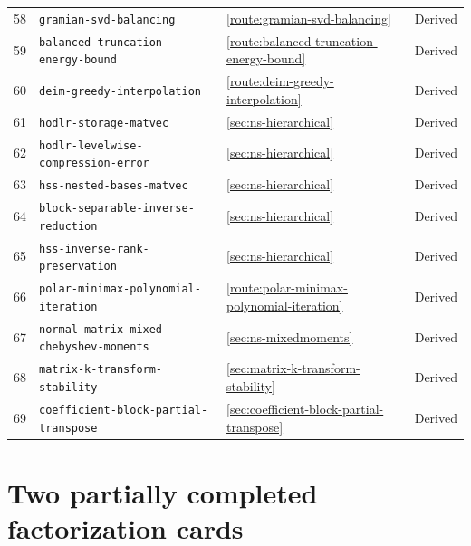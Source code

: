 \documentclass[11pt,a4paper]{article}
\DeclareRobustCommand{\code}[1]{{\footnotesize\urlstyle{tt}\nolinkurl{#1}}}
\begin{document}
\begin{longtable}{@{}r p{} l l@{}}
58 & \code{gramian-svd-balancing} & \ref{route:gramian-svd-balancing} & Derived \\
59 & \code{balanced-truncation-energy-bound} & \ref{route:balanced-truncation-energy-bound} & Derived \\
60 & \code{deim-greedy-interpolation} & \ref{route:deim-greedy-interpolation} & Derived \\
61 & \code{hodlr-storage-matvec} & \ref{sec:ns-hierarchical} & Derived \\
62 & \code{hodlr-levelwise-compression-error} & \ref{sec:ns-hierarchical} & Derived \\
63 & \code{hss-nested-bases-matvec} & \ref{sec:ns-hierarchical} & Derived \\
64 & \code{block-separable-inverse-reduction} & \ref{sec:ns-hierarchical} & Derived \\
65 & \code{hss-inverse-rank-preservation} & \ref{sec:ns-hierarchical} & Derived \\
66 & \code{polar-minimax-polynomial-iteration} & \ref{route:polar-minimax-polynomial-iteration} & Derived \\
67 & \code{normal-matrix-mixed-chebyshev-moments} & \ref{sec:ns-mixedmoments} & Derived \\
68 & \code{matrix-k-transform-stability} & \ref{sec:matrix-k-transform-stability} & Derived \\
69 & \code{coefficient-block-partial-transpose} & \ref{sec:coefficient-block-partial-transpose} & Derived \\
\bottomrule
\end{longtable}
\normalsize
\clearpage
\section{Two partially completed factorization cards}
\end{document}
